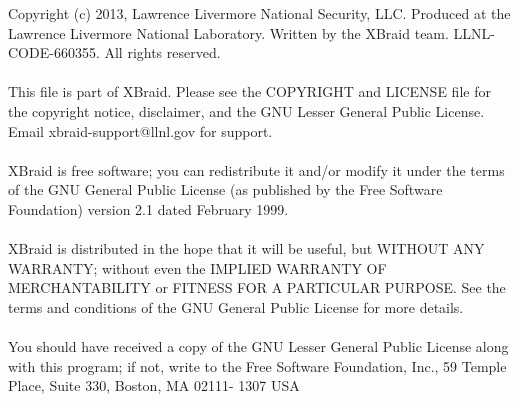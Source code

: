 \documentclass[twoside]{article}
\newcommand{\+}{\discretionary{\mbox{\scriptsize$\hookleftarrow$}}{}{}}
\begin{document}
\begin{titlepage}
Copyright (c) 2013,  Lawrence Livermore National Security, LLC.
Produced at the Lawrence Livermore National Laboratory.
Written by the XBraid team. LLNL-CODE-660355.  All rights reserved.
~\\~\\ 
This file is part of XBraid. Please see the COPYRIGHT and LICENSE file 
for the copyright notice, disclaimer, and the GNU Lesser General Public License.
Email xbraid-support@llnl.gov for support.
~\\~\\
XBraid is free software; you can redistribute it and/or modify it under the
terms of the GNU General Public License (as published by the Free Software
Foundation) version 2.1 dated February 1999.
~\\~\\
XBraid is distributed in the hope that it will be useful, but WITHOUT ANY
WARRANTY; without even the IMPLIED WARRANTY OF MERCHANTABILITY or FITNESS FOR A
PARTICULAR PURPOSE. See the terms and conditions of the GNU General Public
License for more details.
~\\~\\
You should have received a copy of the GNU Lesser General Public License along
with this program; if not, write to the Free Software Foundation, Inc., 59
Temple Place, Suite 330, Boston, MA 02111- 1307 USA

\end{titlepage}
\tableofcontents
{}
\hypersetup{pageanchor=true}

\end{document}
